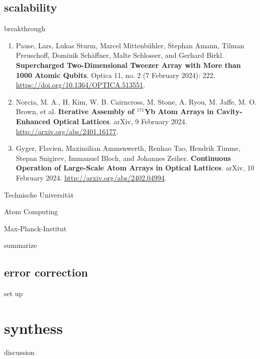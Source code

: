 \documentclass[18 pt]{beamer}
\begin{document}
\subsection{scalability}
\begin{frame}{breakthrough}
  \begin{enumerate}[itemsep=10pt]
    \item Pause, Lars, Lukas Sturm, Marcel Mittenbühler, Stephan Amann, Tilman Preuschoff, Dominik Schäffner, Malte Schlosser, and Gerhard Birkl. \textbf{Supercharged Two-Dimensional Tweezer Array with More than 1000 Atomic Qubits}. Optica 11, no. 2 (7 February 2024): 222. \url{https://doi.org/10.1364/OPTICA.513551}.
    \item Norcia, M. A., H. Kim, W. B. Cairncross, M. Stone, A. Ryou, M. Jaffe, M. O. Brown, et al. \textbf{Iterative Assembly of $^{171}$Yb Atom Arrays in Cavity-Enhanced Optical Lattices}. arXiv, 9 February 2024. \url{http://arxiv.org/abs/2401.16177}.
    \item Gyger, Flavien, Maximilian Ammenwerth, Renhao Tao, Hendrik Timme, Stepan Snigirev, Immanuel Bloch, and Johannes Zeiher. \textbf{Continuous Operation of Large-Scale Atom Arrays in Optical Lattices}. arXiv, 10 February 2024. \url{http://arxiv.org/abs/2402.04994}.
  \end{enumerate}
\end{frame}
\begin{frame}{Technische Universität}
  
\end{frame}
\begin{frame}{Atom Computing}
\end{frame}
\begin{frame}{Max-Planck-Institut}
\end{frame}
\begin{frame}{summarize}
\end{frame}
\subsection{error correction}
\begin{frame}{set up}
\end{frame}
\section{synthess}
\begin{frame}{discussion}
\end{frame}
\end{document}
